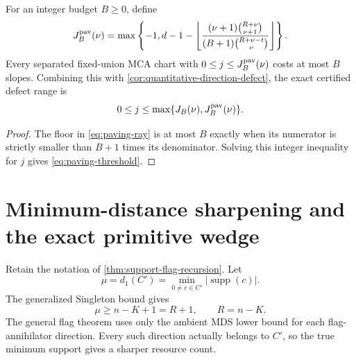 \documentclass[11pt,a4paper]{amsart}
\numberwithin{equation}{section}
\theoremstyle{remark}
\DeclareMathOperator{\supp}{supp}\DeclareMathOperator{\Fib}{Fib}\DeclareMathOperator{\Sym}{Sym}
\begin{document}
\begin{corollary}
\label{cor:paving-threshold}
For an integer budget \(B\ge0\), define
\begin{equation}
 J_B^{\rm pav}(\nu)=
 \max\left\{-1,
 d-1-
 \left\lfloor
 \frac{(\nu+1)\binom{R+\nu}{\nu+1}}
 {(B+1)\binom{R+\nu-t}{\nu}}
 \right\rfloor
 \right\}.
 \label{eq:paving-threshold}
\end{equation}
Every separated fixed-union MCA chart with
\(0\le j\le J_B^{\rm pav}(\nu)\) costs at most \(B\) slopes.  Combining
this with \cref{cor:quantitative-direction-defect}, the exact certified
defect range is
\[
                0\le j\le
                \max\{J_B(\nu),J_B^{\rm pav}(\nu)\}.
\]
\end{corollary}

\begin{proof}
The floor in \eqref{eq:paving-ray} is at most \(B\) exactly when its
numerator is strictly smaller than \(B+1\) times its denominator.  Solving
this integer inequality for \(j\) gives \eqref{eq:paving-threshold}.
\end{proof}




\section{Minimum-distance sharpening and the exact primitive wedge}
\label{sec:min-distance-sharpening}
Retain the notation of \cref{thm:support-flag-recursion}.  Let
\[
 \mu=d_1(C')=\min_{0\ne c\in C'}|\supp(c)|.
\]
The generalized Singleton bound gives
\[
 \mu\ge n-K+1=R+1,
 \qquad R=n-K.
\]
The general flag theorem uses only the ambient MDS lower bound for each flag-annihilator direction.  Every such direction actually belongs to $C'$, so the true minimum support gives a sharper resource count.
\end{document}
